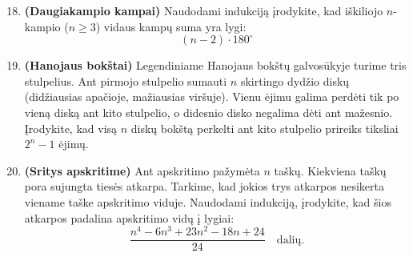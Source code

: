 \documentclass[11pt,a4paper]{scrartcl}
\begin{document}
\begin{enumerate}
    \setcounter{enumi}{17}
    \item \textbf{(Daugiakampio kampai)} Naudodami indukciją įrodykite, kad iškiliojo $n$-kampio ($n \ge 3$) vidaus kampų suma yra lygi:
    $$ (n - 2) \cdot 180^\circ $$
    
    \item \textbf{(Hanojaus bokštai)} Legendiniame Hanojaus bokštų galvosūkyje turime tris stulpelius. Ant pirmojo stulpelio sumauti $n$ skirtingo dydžio diskų (didžiausias apačioje, mažiausias viršuje). Vienu ėjimu galima perdėti tik po vieną diską ant kito stulpelio, o didesnio disko negalima dėti ant mažesnio. Įrodykite, kad visą $n$ diskų bokštą perkelti ant kito stulpelio prireiks tiksliai $2^n - 1$ ėjimų.
    
    \item \textbf{(Sritys apskritime)} Ant apskritimo pažymėta $n$ taškų. Kiekviena taškų pora sujungta tiesės atkarpa. Tarkime, kad jokios trys atkarpos nesikerta viename taške apskritimo viduje. Naudodami indukciją, įrodykite, kad šios atkarpos padalina apskritimo vidų į lygiai:
    $$ \frac{n^4 - 6n^3 + 23n^2 - 18n + 24}{24} \quad \text{dalių.} $$
\end{enumerate}
\end{document}
